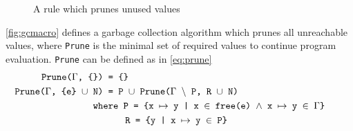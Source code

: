 \begin{figure}[ht]
	\begin{mdframed}
		\begin{prooftree}
		\end{prooftree}
	\end{mdframed}
	\caption{A rule which prunes unused values}
	\label{fig:gcmacro}
\end{figure}
\autoref{fig:gcmacro} defines a garbage collection algorithm which prunes all unreachable values, where \texttt{Prune} is the minimal set of required values to continue program evaluation.
\texttt{Prune} can be defined as in \autoref{eq:prune}
\begin{align}
	\texttt{Prune($\Gamma$, \{\}) }           & \texttt{= \{\}} \label{eq:prune}                                        \\
	\texttt{Prune($\Gamma$, \{e\} $\cup$ N) } & \texttt{=  P $\cup$ Prune($\Gamma$ $\backslash$ P, R $\cup$ N)} \tag*{} \\
	\texttt{whe}&\texttt{re P = \{x $\mapsto$ y | x $\in$ free(e) $\land$ x $\mapsto$ y $\in$ $\Gamma$\}} \tag*{}                    \\
	&\hspace{0.62cm}\texttt{R = \{y | x $\mapsto$ y $\in$ P\}} \tag*{}                                                               \\
\end{align}


